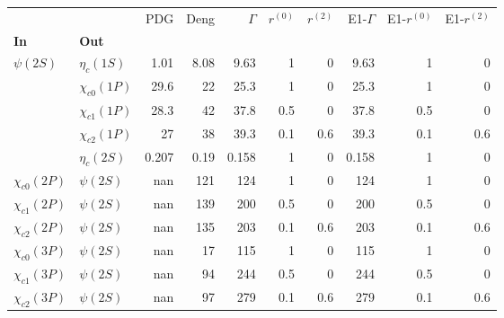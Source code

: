\begin{tabular}{l|l|r|r|r|r|r|r|r|r}
\toprule
                &            &   PDG &  Deng &  $\Gamma$ &  $r^{(0)}$ &  $r^{(2)}$ &  E1-$\Gamma$ &  E1-$r^{(0)}$ &  E1-$r^{(2)}$ \\
\textbf{In} & \textbf{Out} &       &       &           &            &            &              &               &               \\
\midrule
\textbf{$\psi(2S)$} & \textbf{$\eta_{c}(1S)$} &  1.01 &  8.08 &      9.63 &          1 &          0 &         9.63 &             1 &             0 \\
                & \textbf{$\chi_{c0}(1P)$} &  29.6 &    22 &      25.3 &          1 &          0 &         25.3 &             1 &             0 \\
                & \textbf{$\chi_{c1}(1P)$} &  28.3 &    42 &      37.8 &        0.5 &          0 &         37.8 &           0.5 &             0 \\
                & \textbf{$\chi_{c2}(1P)$} &    27 &    38 &      39.3 &        0.1 &        0.6 &         39.3 &           0.1 &           0.6 \\
                & \textbf{$\eta_{c}(2S)$} & 0.207 &  0.19 &     0.158 &          1 &          0 &        0.158 &             1 &             0 \\
\textbf{$\chi_{c0}(2P)$} & \textbf{$\psi(2S)$} &   nan &   121 &       124 &          1 &          0 &          124 &             1 &             0 \\
\textbf{$\chi_{c1}(2P)$} & \textbf{$\psi(2S)$} &   nan &   139 &       200 &        0.5 &          0 &          200 &           0.5 &             0 \\
\textbf{$\chi_{c2}(2P)$} & \textbf{$\psi(2S)$} &   nan &   135 &       203 &        0.1 &        0.6 &          203 &           0.1 &           0.6 \\
\textbf{$\chi_{c0}(3P)$} & \textbf{$\psi(2S)$} &   nan &    17 &       115 &          1 &          0 &          115 &             1 &             0 \\
\textbf{$\chi_{c1}(3P)$} & \textbf{$\psi(2S)$} &   nan &    94 &       244 &        0.5 &          0 &          244 &           0.5 &             0 \\
\textbf{$\chi_{c2}(3P)$} & \textbf{$\psi(2S)$} &   nan &    97 &       279 &        0.1 &        0.6 &          279 &           0.1 &           0.6 \\
\bottomrule
\end{tabular}
